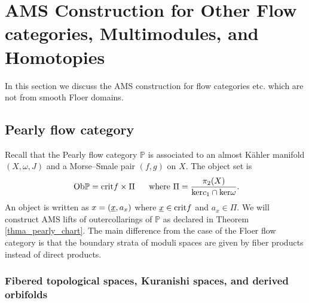 \documentclass[reqno, 10pt]{amsart}
\numberwithin{equation}{section}
\numberwithin{equation}{section}
\theoremstyle{definition}
\theoremstyle{remark}
\newcommand{\mb}{\mathbb}
\newcommand{\uds}[1]{\underline{\smash{#1}}}
\begin{document}
\section{AMS Construction for Other Flow categories, Multimodules, and Homotopies}\label{section_PSS_AMS}

In this section we discuss the AMS construction for flow categories etc. which are not from smooth Floer domains. 




\subsection{Pearly flow category}\label{AMS_pearly}

Recall that the Pearly flow category $\mb{P}$ is associated to an almost K\"ahler manifold $(X, \omega, J)$ and a Morse--Smale pair $(f, g)$ on $X$. The object set is 
\begin{align*}
&\ {\rm Ob} \mb{P} = {\rm crit} f \times \Pi\ &\  {\rm where}\ \Pi = \frac{\pi_2(X)}{{\rm ker} c_1 \cap {\rm ker} \omega}.
\end{align*}
An object is written as $x = (\uds x, a_x)$ where $\uds x \in {\rm crit} f$ and $a_x \in \Pi$. We will construct AMS lifts of outercollarings of $\mb{P}$ as declared in Theorem \ref{thma_pearly_chart}. The main difference from the case of the Floer flow category is that the boundary strata of moduli spaces are given by fiber products instead of direct products. 














\subsubsection{Fibered topological spaces, Kuranishi spaces, and derived orbifolds}
\end{document}
